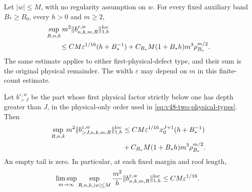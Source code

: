 \begin{theorem}
\label{thm:v49-physical-remainder-local}
Let $|w|\le M$, with no regularity assumption on $w$. For every fixed
auxiliary band $B_*\ge B_0$, every $h>0$ and $m\ge2$,
\begin{align}
 &\sup_{R,n,k}m^2
        \|b^{\varepsilon,w}_{n,k,m,R}\|_{1,h}^{\rm loc}\notag\\
 &\qquad\le CM\varepsilon^{1/16}(h+B_*^{-1})
       +C_{B_*}M(1+B_*h)m^3\rho_{B_*}^{m/2}.
                                      \label{eq:v49-physical-window-bound}
\end{align}
The same estimate applies to either first-physical-defect type, and
their sum is the original physical remainder. The width $\varepsilon$
may depend on $m$ in this finite-count estimate.

Let $b_{>J}^{\varepsilon,w}$ be the part whose first physical factor
strictly below one has depth greater than $J$, in the physical-only
order used in \eqref{eq:v48-two-physical-types}. Then
\begin{align}
 &\sup_{R,n,k}m^2\|b_{>J,n,k,m,R}^{\varepsilon,w}\|_{1,h}^{\rm loc}
 \le CM\varepsilon^{1/16}x_0^{J+1}(h+B_*^{-1})\notag\\
 &\hspace{37mm}+C_{B_*}M(1+B_*h)m^3\rho_{B_*}^{m/2}.
                                      \label{eq:v49-physical-depth-tail}
\end{align}
An empty tail is zero. In particular, at each fixed margin and roof
length,
\begin{equation}\label{eq:v49-local-limsup}
 \limsup_{m\to\infty}\sup_{R,n,k,|w|\le M}
       \frac{m^2}{h}\|b^{\varepsilon,w}_{n,k,m,R}\|_{1,h}^{\rm loc}
                                    \le CM\varepsilon^{1/16}.
\end{equation}
\end{theorem}
